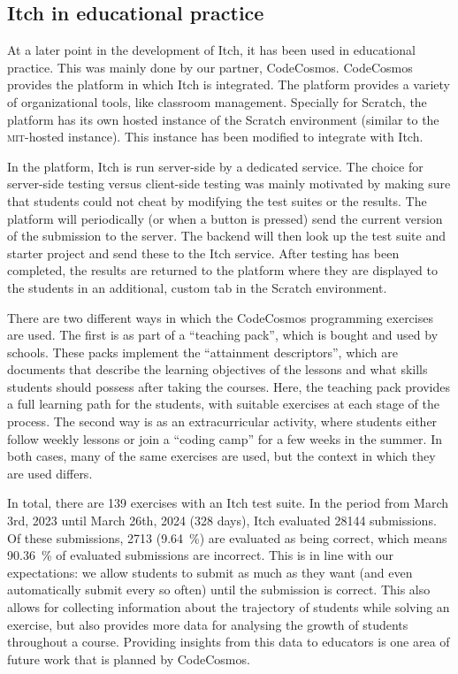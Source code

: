 \documentclass[../main]{subfiles}
\begin{document}
\subsection{Itch in educational practice}\label{subsec:itch-in-educational-practice}

At a later point in the development of Itch, it has been used in educational practice.
This was mainly done by our partner, CodeCosmos.
CodeCosmos provides the platform in which Itch is integrated.
The platform provides a variety of organizational tools, like classroom management.
Specially for Scratch, the platform has its own hosted instance of the Scratch environment (similar to the \textsc{mit}-hosted instance).
This instance has been modified to integrate with Itch.

In the platform, Itch is run server-side by a dedicated service.
The choice for server-side testing versus client-side testing was mainly motivated by making sure that students could not cheat by modifying the test suites or the results.
The platform will periodically (or when a button is pressed) send the current version of the submission to the server.
The backend will then look up the test suite and starter project and send these to the Itch service.
After testing has been completed, the results are returned to the platform where they are displayed to the students in an additional, custom tab in the Scratch environment.

There are two different ways in which the CodeCosmos programming exercises are used.
The first is as part of a ``teaching pack'', which is bought and used by schools.
These packs implement the ``attainment descriptors'', which are documents that describe the learning objectives of the lessons and what skills students should possess after taking the courses.
Here, the teaching pack provides a full learning path for the students, with suitable exercises at each stage of the process.
The second way is as an extracurricular activity, where students either follow weekly lessons or join a ``coding camp'' for a few weeks in the summer.
In both cases, many of the same exercises are used, but the context in which they are used differs.

In total, there are 139 exercises with an Itch test suite.
In the period from March 3rd, 2023 until March 26th, 2024 (328 days), Itch evaluated \num{28144} submissions.
Of these submissions, \num{2713} (\qty{9.64}{\percent}) are evaluated as being correct, which means \qty{90.36}{\percent} of evaluated submissions are incorrect.
This is in line with our expectations: we allow students to submit as much as they want (and even automatically submit every so often) until the submission is correct.
This also allows for collecting information about the trajectory of students while solving an exercise, but also provides more data for analysing the growth of students throughout a course.
Providing insights from this data to educators is one area of future work that is planned by CodeCosmos.
\end{document}
